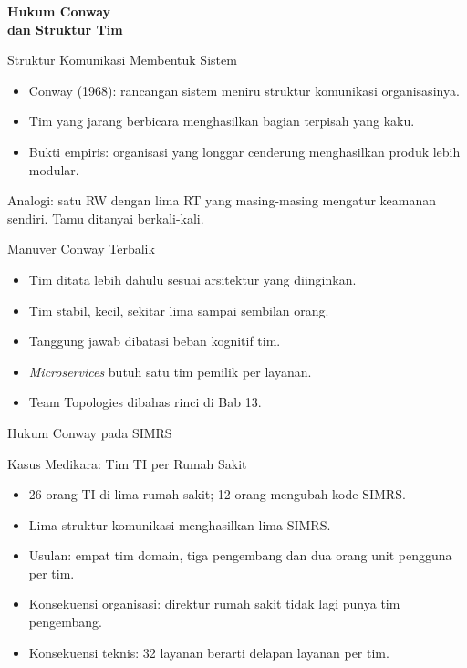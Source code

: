 \documentclass[aspectratio=169, table, 12pt]{beamer}
\begin{document}
\begin{frame}{\hfill}
  \centering
  \Huge{\textbf{Hukum Conway\\dan Struktur Tim}}
\end{frame}

\begin{frame}{{\Large Struktur Komunikasi Membentuk Sistem}}
  \vspace{10pt}
  \begin{itemize}
    \item Conway (1968): rancangan sistem meniru struktur komunikasi organisasinya.
    \item Tim yang jarang berbicara menghasilkan bagian terpisah yang kaku.
    \item Bukti empiris: organisasi yang longgar cenderung menghasilkan produk lebih modular.
  \end{itemize}
  \vspace{6pt}
  {\small Analogi: satu RW dengan lima RT yang masing-masing mengatur keamanan sendiri. Tamu
  ditanyai berkali-kali.}
\end{frame}

\begin{frame}{{\Large Manuver Conway Terbalik}}
  \vspace{10pt}
  \begin{itemize}
    \item Tim ditata lebih dahulu sesuai arsitektur yang diinginkan.
    \item Tim stabil, kecil, sekitar lima sampai sembilan orang.
    \item Tanggung jawab dibatasi beban kognitif tim.
    \item \textit{Microservices} butuh satu tim pemilik per layanan.
    \item Team Topologies dibahas rinci di Bab 13.
  \end{itemize}
\end{frame}

\begin{frame}{{\Large Hukum Conway pada SIMRS}}
  \centering
\end{frame}

\begin{frame}{{\Large Kasus Medikara: Tim TI per Rumah Sakit}}
  \vspace{10pt}
  \begin{itemize}
    \item 26 orang TI di lima rumah sakit; 12 orang mengubah kode SIMRS.
    \item Lima struktur komunikasi menghasilkan lima SIMRS.
    \item Usulan: empat tim domain, tiga pengembang dan dua orang unit pengguna per tim.
    \item Konsekuensi organisasi: direktur rumah sakit tidak lagi punya tim pengembang.
    \item Konsekuensi teknis: 32 layanan berarti delapan layanan per tim.
  \end{itemize}
\end{frame}
\end{document}
